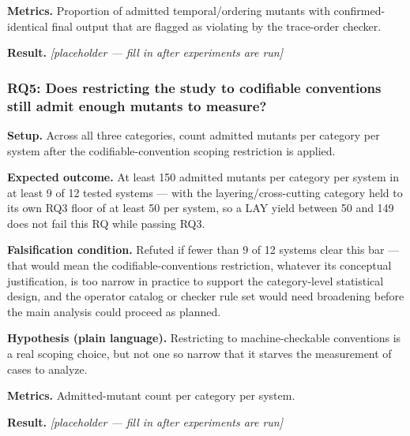 \documentclass[11pt]{article}
\newcommand{\ph}{\textit{[placeholder --- fill in after experiments are run]}}
\begin{document}
\textbf{Metrics.} Proportion of admitted temporal/ordering mutants with confirmed-identical final output that are flagged as violating by the trace-order checker.

\textbf{Result.} \ph

\subsubsection{RQ5: Does restricting the study to codifiable conventions still admit enough mutants to measure?}
\textbf{Setup.} Across all three categories, count admitted mutants per category per system after the codifiable-convention scoping restriction is applied.

\textbf{Expected outcome.} At least 150 admitted mutants per category per system in at least 9 of 12 tested systems --- with the layering/cross-cutting category held to its own RQ3 floor of at least 50 per system, so a LAY yield between 50 and 149 does not fail this RQ while passing RQ3.

\textbf{Falsification condition.} Refuted if fewer than 9 of 12 systems clear this bar --- that would mean the codifiable-conventions restriction, whatever its conceptual justification, is too narrow in practice to support the category-level statistical design, and the operator catalog or checker rule set would need broadening before the main analysis could proceed as planned.

\textbf{Hypothesis (plain language).} Restricting to machine-checkable conventions is a real scoping choice, but not one so narrow that it starves the measurement of cases to analyze.

\textbf{Metrics.} Admitted-mutant count per category per system.

\textbf{Result.} \ph
\end{document}
